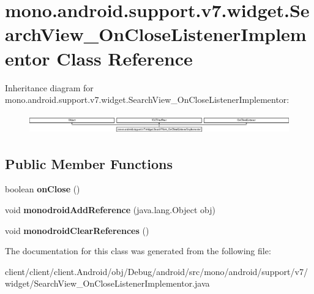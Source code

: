 \hypertarget{classmono_1_1android_1_1support_1_1v7_1_1widget_1_1SearchView__OnCloseListenerImplementor}{}\section{mono.\+android.\+support.\+v7.\+widget.\+Search\+View\+\_\+\+On\+Close\+Listener\+Implementor Class Reference}
\label{classmono_1_1android_1_1support_1_1v7_1_1widget_1_1SearchView__OnCloseListenerImplementor}
Inheritance diagram for mono.\+android.\+support.\+v7.\+widget.\+Search\+View\+\_\+\+On\+Close\+Listener\+Implementor\+:\begin{figure}[H]
\begin{center}
\leavevmode
\includegraphics[height=0.844646cm]{classmono_1_1android_1_1support_1_1v7_1_1widget_1_1SearchView__OnCloseListenerImplementor}
\end{center}
\end{figure}
\subsection*{Public Member Functions}
\begin{DoxyCompactItemize}
\item 
\hypertarget{classmono_1_1android_1_1support_1_1v7_1_1widget_1_1SearchView__OnCloseListenerImplementor_a5f434ffc99aab8b87c5cb0e0fbdde7bc}{}boolean {\bfseries on\+Close} ()\label{classmono_1_1android_1_1support_1_1v7_1_1widget_1_1SearchView__OnCloseListenerImplementor_a5f434ffc99aab8b87c5cb0e0fbdde7bc}

\item 
\hypertarget{classmono_1_1android_1_1support_1_1v7_1_1widget_1_1SearchView__OnCloseListenerImplementor_a5622e5a877333e34785ae8e8343ee55f}{}void {\bfseries monodroid\+Add\+Reference} (java.\+lang.\+Object obj)\label{classmono_1_1android_1_1support_1_1v7_1_1widget_1_1SearchView__OnCloseListenerImplementor_a5622e5a877333e34785ae8e8343ee55f}

\item 
\hypertarget{classmono_1_1android_1_1support_1_1v7_1_1widget_1_1SearchView__OnCloseListenerImplementor_a0b4a5624059750f110ead6d67deaad28}{}void {\bfseries monodroid\+Clear\+References} ()\label{classmono_1_1android_1_1support_1_1v7_1_1widget_1_1SearchView__OnCloseListenerImplementor_a0b4a5624059750f110ead6d67deaad28}

\end{DoxyCompactItemize}


The documentation for this class was generated from the following file\+:\begin{DoxyCompactItemize}
\item 
client/client/client.\+Android/obj/\+Debug/android/src/mono/android/support/v7/widget/Search\+View\+\_\+\+On\+Close\+Listener\+Implementor.\+java\end{DoxyCompactItemize}
